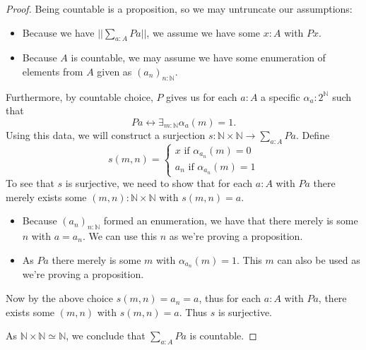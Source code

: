\documentclass{../util/zariski-small}
\begin{document}
\begin{proof}
  Being countable is a proposition, so we may untruncate our assumptions:
  \begin{itemize}
    \item 
      Because we have $||\sum_{a:A} P a||$, we assume we have  some $x:A$ with $P x$. 
    \item 
      Because $A$ is countable, we may assume we have some 
      enumeration of elements from $A$ given as $(a_n)_{n:\mathbb N}$.
  \end{itemize}
  Furthermore, by countable choice, $P$ gives us 
  for each $a:A$ a specific $\alpha_a:2^\mathbb N$ 
  such that 
  \begin{equation}
    P a \leftrightarrow \exists_{m:\mathbb N} \alpha_a(m) = 1.
  \end{equation}
  Using this data, we will 
  construct a surjection $s:\mathbb N \times \mathbb N \to \sum_{a:A} P a$. 
  Define 
  \begin{equation}
    s(m,n) = 
    \begin{cases}
      x \text{ if } \alpha_{a_n}(m) = 0 \\
      a_n \text{ if } \alpha_{a_n}(m) = 1
    \end{cases}
  \end{equation}
  To see that $s$ is surjective, we need to show that for each $a:A$ with $P a$ there 
  merely exists some $(m,n):\mathbb N \times \mathbb N$ 
  with $s(m,n) = a$. 
  \begin{itemize}
    \item 
  Because $(a_n)_{n:\mathbb N}$ formed an enumeration, we have that 
  there merely is some $n$ with $a = a_n$. 
  We can use this $n$ as we're proving a proposition. 
    \item 
  As $P a$ there merely is some $m$ with $\alpha_{a_n}(m) = 1$. 
  This $m$ can also be used as we're proving a proposition. 
  \end{itemize}
  Now by the above choice $s(m,n) = a_n = a$, 
  thus for each $a:A$ with $P a$, there exists some $(m,n)$ with 
  $s(m,n) = a$. Thus $s$ is surjective. 

  As $\mathbb N \times \mathbb N \simeq \mathbb N$, we conclude that 
  $\sum_{a:A} P a$ is countable. 
\end{proof}
\end{document}
